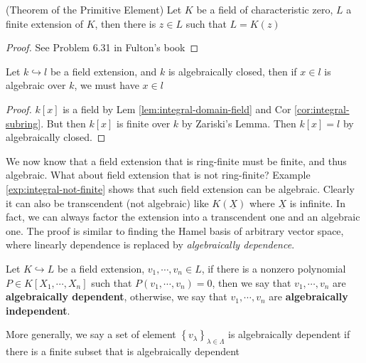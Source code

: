 \documentclass{note-eng}
\begin{document}
\begin{theorem}
    (Theorem of the Primitive Element) Let $K$ be a field of characteristic zero, $L$ a finite extension of $K$, then there is $z \in L$ such that $L = K(z)$
\end{theorem}

\begin{proof}
    \TODO See Problem 6.31 in Fulton's book
\end{proof}

\fi

\begin{corollary}
    Let $k \hookrightarrow l$ be a field extension, and $k$ is algebraically closed, then if $x \in l$ is algebraic over $k$, we must have $x \in l$
\end{corollary}

\begin{proof}
    $k[x]$ is a field by Lem \ref{lem:integral-domain-field} and Cor \ref{cor:integral-subring}. But then $k[x]$ is finite over $k$ by Zariski's Lemma. Then $k[x] = l$ by algebraically closed.
\end{proof}

We now know that a field extension that is ring-finite must be finite, and thus algebraic. What about field extension that is not ring-finite? Example \ref{exp:integral-not-finite} shows that such field extension can be algebraic. Clearly it can also be transcendent (not algebraic) like $K(\underline{X})$ where $\underline{X}$ is infinite. In fact, we can always factor the extension into a transcendent one and an algebraic one. The proof is similar to finding the Hamel basis of arbitrary vector space, where linearly dependence is replaced by \textit{algebraically dependence}.

\begin{definition}
    Let $K \hookrightarrow L$ be a field extension, $v_1, \cdots, v_n \in L$, if there is a nonzero polynomial $P \in K[X_1, \cdots, X_n]$ such that $P(v_1, \cdots, v_n) = 0$, then we say that $v_1, \cdots, v_n$ are \textbf{algebraically dependent}, otherwise, we say that $v_1, \cdots, v_n$ are \textbf{algebraically independent}.

    More generally, we say a set of element $\left\lbrace v_{\lambda} \right\rbrace_{\lambda \in \Lambda}$ is algebraically dependent if there is a finite subset that is algebraically dependent
\end{definition}
\end{document}
